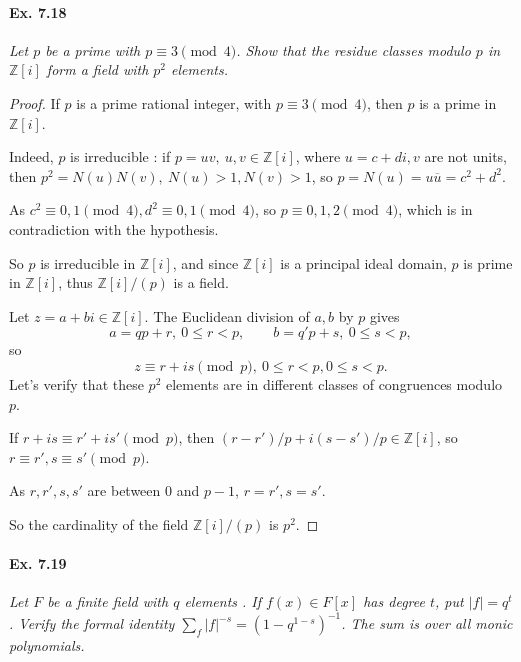 \documentclass[11pt,a4paper]{article}
\newcommand{\Z}{\mathbb{Z}}
\begin{document}
\paragraph{Ex. 7.18}

{\it Let $p$ be a prime with $p\equiv 3 \pmod 4$. Show that the residue classes modulo $p$ in $\Z[i]$ form a field with $p^2$ elements.
}

\begin{proof}
If $p$ is a prime rational integer, with $p\equiv 3 \pmod 4$, then $p$ is a prime in $\Z[i]$.

Indeed, $p$ is irreducible : if $p = uv,\ u,v \in \Z[i]$, where $u = c+di,v$ are not units, then $p^2 = N(u)N(v),\ N(u)>1,N(v)>1$, so $p = N(u) = u \overline{u} = c^2+d^2$.

 As $c^2\equiv 0,1 \pmod 4, d^2 \equiv 0,1 \pmod 4$, so $p \equiv 0,1,2 \pmod 4$, which is in contradiction with the hypothesis.
 
 So $p$ is irreducible in $\Z[i]$, and since $\Z[i]$ is a principal ideal domain, $p$ is prime in $\Z[i]$, thus $\Z[i]/( p )$ is a field.
 
 Let $z = a+bi \in \Z[i]$. The Euclidean division of $a,b$ by $p$ gives 
 $$a = qp+r,\ 0\leq r < p, \qquad b = q'p+s, \ 0\leq s < p,$$
 so $$z \equiv r+is \pmod p,\ 0\leq r <p, 0 \leq s < p.$$
 Let's verify that these $p^2$ elements are in different classes of congruences modulo $p$.
 
 If $r+is \equiv r'+is' \pmod p$, then $(r-r')/p + i(s-s')/p \in \Z[i]$, so $r\equiv r',s\equiv s' \pmod p$.
 
 As $r,r',s,s'$ are between $0$ and $p-1$, $r=r', s= s'$.
 
 So the cardinality of the field $\Z[i]/( p )$ is $p^2$.
\end{proof}

\paragraph{Ex. 7.19}

{\it Let $F$ be a finite field with $q$ elements . If $f(x) \in F[x]$ has degree $t$, put $|f| = q^t$. Verify the formal identity $\sum_f |f|^{-s} = (1-q^{1-s})^{-1}$. The sum is over all monic polynomials.

}
\end{document}

